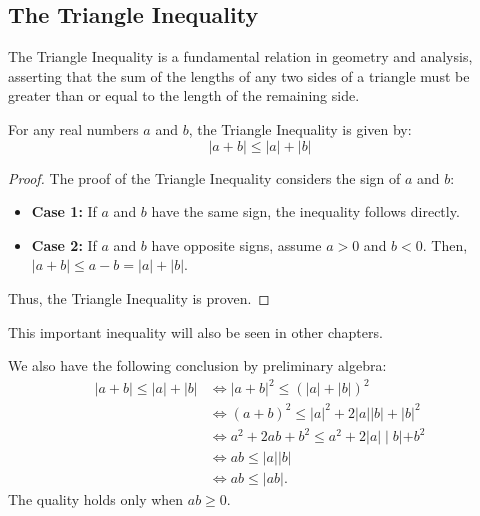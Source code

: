 \subsection{The Triangle Inequality}
The Triangle Inequality is a fundamental relation in geometry and analysis, asserting that the sum of the lengths of any two sides of a triangle must be greater than or equal to the length of the remaining side.
    \begin{definition} \label{triangularineq}
        For any real numbers \( a \) and \( b \), the Triangle Inequality is given by:
        \[ |a + b| \leq |a| + |b| \]
    \end{definition}
    \begin{proof}
        The proof of the Triangle Inequality considers the sign of \( a \) and \( b \):
    \begin{itemize}
     \item \textbf{Case 1:} If \( a \) and \( b \) have the same sign, the inequality follows directly.
        \item \textbf{Case 2:} If \( a \) and \( b \) have opposite signs, assume \( a > 0 \) and \( b < 0      \). Then, \( |a + b| \leq a - b = |a| + |b| \).
    \end{itemize}
    Thus, the Triangle Inequality is proven.
    \end{proof}
    \begin{remark}
        This important inequality will also be seen in other chapters.
    \end{remark}
We also have the following conclusion by preliminary algebra:
$$
\begin{aligned}
    |a{+}b|{\leqslant}|a|+|b|& \Leftrightarrow|a{+}b|^2{\leqslant}(|a|{+}|b|)^2  \\
    &\Leftrightarrow(a+b)^2\leqslant|a|^2+2|a||b|+|b|^2 \\
    &\Leftrightarrow a^2+2ab+b^2\leqslant a^2+2|a|\mid b|+b^2 \\
    &\Leftrightarrow ab{\leqslant}|a|\left|b\right| \\
    &\Leftrightarrow ab\leqslant\lvert ab\rvert.
    \end{aligned}
$$
The quality holds only when $ab \geq 0$.
